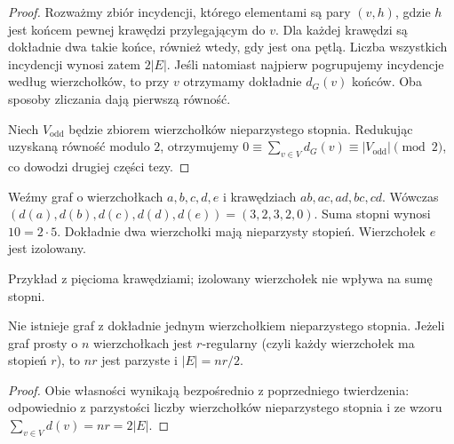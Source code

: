 \begin{proof}
Rozważmy zbiór incydencji, którego elementami są pary
$(v,h)$, gdzie $h$ jest końcem pewnej krawędzi przylegającym
do $v$. Dla każdej krawędzi są dokładnie dwa takie końce,
również wtedy, gdy jest ona pętlą. Liczba wszystkich
incydencji wynosi zatem $2|E|$. Jeśli natomiast
najpierw pogrupujemy incydencje według wierzchołków,
to przy $v$ otrzymamy dokładnie $d_G(v)$ końców.
Oba sposoby zliczania dają pierwszą równość.

Niech $V_{\mathrm{odd}}$ będzie zbiorem wierzchołków
nieparzystego stopnia. Redukując uzyskaną równość modulo
$2$, otrzymujemy
$0\equiv\sum_{v\in V}d_G(v)\equiv
|V_{\mathrm{odd}}|\pmod2$, co dowodzi drugiej części tezy.
\end{proof}

\begin{przyklad}
Weźmy graf o wierzchołkach $a,b,c,d,e$ i krawędziach
$ab,ac,ad,bc,cd$. Wówczas
$(d(a),d(b),d(c),d(d),d(e))=(3,2,3,2,0)$.
Suma stopni wynosi $10=2\cdot5$. Dokładnie dwa
wierzchołki mają nieparzysty stopień. Wierzchołek $e$
jest izolowany.
\end{przyklad}

\begin{center}

{\footnotesize Przykład z pięcioma krawędziami; izolowany
wierzchołek nie wpływa na sumę stopni.}
\end{center}

\begin{wniosek}
Nie istnieje graf z dokładnie jednym wierzchołkiem
nieparzystego stopnia. Jeżeli graf prosty o $n$
wierzchołkach jest $r$-regularny (czyli każdy wierzchołek
ma stopień $r$), to $nr$ jest parzyste i
$|E|=nr/2$.
\end{wniosek}

\begin{proof}
Obie własności wynikają bezpośrednio z poprzedniego
twierdzenia: odpowiednio z parzystości liczby
wierzchołków nieparzystego stopnia i ze wzoru
$\sum_{v\in V}d(v)=nr=2|E|$.
\end{proof}

